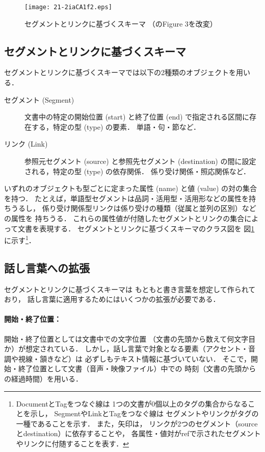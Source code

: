 \documentclass[japanese]{jnlp_1.4}
\begin{document}
\begin{figure}[t]
\begin{center}
\texttt{[image: 21-2iaCA1f2.eps]}
\end{center}
\caption{セグメントとリンクに基づくスキーマ
（\protect\cite{Kaplan_2010_APM}のFigure 3を改変）}
\label{fig:SLAT}
\end{figure}


\subsection{セグメントとリンクに基づくスキーマ}

セグメントとリンクに基づくスキーマでは以下の2種類のオブジェクトを用いる．

\begin{description}
 \item[セグメント (Segment)]
文書中の特定の開始位置 (start)
と終了位置 (end)
で指定される区間に存在する，特定の型 (type)
の要素．
単語・句・節など．
 \item[リンク (Link)]
参照元セグメント (source)
と参照先セグメント (destination)
の間に設定される，特定の型 (type)
の依存関係．
係り受け関係・照応関係など．
\end{description}

いずれのオブジェクトも型ごとに定まった属性 (name) 
と値 (value) 
の対の集合を持つ．
たとえば，単語型セグメントは品詞・活用型・活用形などの属性を持ちうるし，
係り受け関係型リンクは係り受けの種類（従属と並列の区別）などの属性を
持ちうる．
これらの属性値が付随したセグメントとリンクの集合によって文書を表現する．
セグメントとリンクに基づくスキーマのクラス図を
図\ref{fig:SLAT}に示す\footnote{
 DocumentとTagをつなぐ線は
1つの文書が0個以上のタグの集合からなることを示し，
SegmentやLinkとTagをつなぐ線は
セグメントやリンクがタグの一種であることを示す．
また，矢印は，
リンクが2つのセグメント（sourceとdestination）に依存することや，
各属性・値対がrefで示されたセグメントやリンクに付随することを表す．
}．


\subsection{話し言葉への拡張}
\label{sec:DB:spoken}

セグメントとリンクに基づくスキーマは
もともと書き言葉を想定して作られており，
話し言葉に適用するためにはいくつかの拡張が必要である．


\paragraph{開始・終了位置：}
開始・終了位置としては文書中での文字位置
（文書の先頭から数えて何文字目か）が想定されている．
しかし，話し言葉で対象となる要素（アクセント・音調や視線・頷きなど）は
必ずしもテキスト情報に基づいていない．
そこで，開始・終了位置として文書（音声・映像ファイル）中での
時刻（文書の先頭からの経過時間）を用いる．
\end{document}
